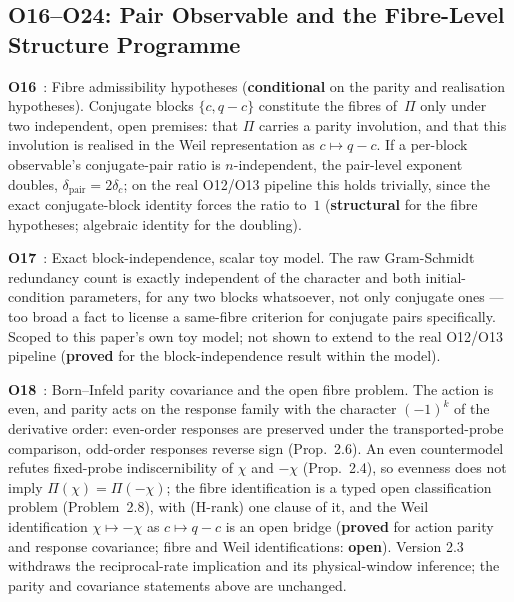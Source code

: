 \documentclass[11pt,a4paper]{article}
\newcommand{\sproved}{\textcolor{cproved}{\textbf{proved}}}
\newcommand{\sstruct}{\textcolor{cstruct}{\textbf{structural}}}
\newcommand{\sopen}{\textcolor{copen}{\textbf{open}}}
\newcommand{\scond}{\textcolor{ccond}{\textbf{conditional}}}
\begin{document}
  \subsection{O16--O24: Pair Observable and the Fibre-Level Structure Programme}

    \textbf{O16}~\cite{Beau2026a20}: Fibre admissibility hypotheses (\scond{} on the parity and realisation hypotheses).
    Conjugate blocks $\{c,q-c\}$ constitute the fibres of~$\Pi$ only under two independent,
    open premises: that $\Pi$ carries a parity involution, and that this involution is
    realised in the Weil representation as $c\mapsto q-c$.
    If a per-block observable's conjugate-pair ratio is $n$-independent, the pair-level
    exponent doubles, $\delta_{\mathrm{pair}} = 2\delta_c$; on the real O12/O13 pipeline this
    holds trivially, since the exact conjugate-block identity forces the ratio to~$1$
    (\sstruct{} for the fibre hypotheses; algebraic identity for the doubling).

    \textbf{O17}~\cite{Beau2026a21}: Exact block-independence, scalar toy model.
    The raw Gram-Schmidt redundancy count is exactly independent of the character and both
    initial-condition parameters, for any two blocks whatsoever, not only conjugate ones ---
    too broad a fact to license a same-fibre criterion for conjugate pairs specifically.
    Scoped to this paper's own toy model; not shown to extend to the real O12/O13 pipeline
    (\sproved{} for the block-independence result within the model).

    \textbf{O18}~\cite{Beau2026a22}: Born--Infeld parity covariance and the open fibre
    problem.
    The action is even, and parity acts on the response family with the character
    $(-1)^{k}$ of the derivative order: even-order responses are preserved under the
    transported-probe comparison, odd-order responses reverse sign (Prop.~2.6).
    An even countermodel refutes fixed-probe indiscernibility of $\chi$ and $-\chi$
    (Prop.~2.4), so evenness does not imply $\Pi(\chi)=\Pi(-\chi)$; the fibre
    identification is a typed open classification problem (Problem~2.8), with (H-rank)
    one clause of it, and the Weil identification $\chi\mapsto-\chi$ as $c\mapsto q-c$
    is an open bridge
    (\sproved{} for action parity and response covariance; fibre and Weil
    identifications: \sopen).
    Version 2.3 withdraws the reciprocal-rate implication and its physical-window inference; the parity
    and covariance statements above are unchanged.
\end{document}
